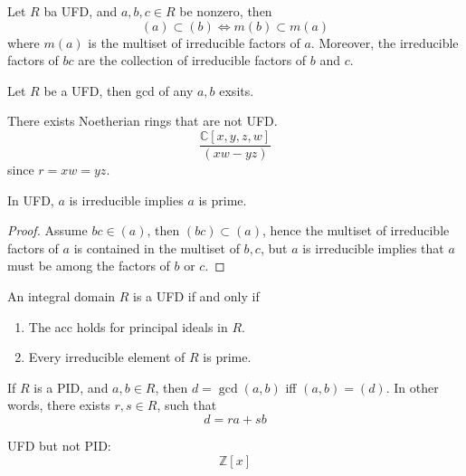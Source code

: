 \documentclass[openany]{book}
\newcommand{\Z}{\mathbb{Z}}
\newcommand{\C}{\mathbb{C}}
\begin{document}
\begin{prop}
    Let $R$ ba UFD, and $a,b,c\in R$ be nonzero, then 
    \begin{equation*}
        (a)\subset(b)\iff m(b)\subset m(a)
    \end{equation*}
    where $m(a)$ is the multiset of irreducible factors of $a$. Moreover, the irreducible factors of $bc$ are the collection of irreducible factors of $b$ and $c$.
\end{prop}



\begin{prop}
    Let $R$ be a UFD, then gcd of any $a,b$ exsits.
\end{prop}
\begin{example}
    There exists Noetherian rings that are not UFD.
    \begin{equation*}
        \frac{\C[x,y,z,w]}{(xw-yz)}
    \end{equation*}
    since $r=xw=yz$.
\end{example}


\begin{prop}
    In UFD, $a$ is irreducible implies $a$ is prime.
\end{prop}
\begin{proof}
    Assume $bc\in (a)$, then $(bc)\subset (a)$, hence the multiset of irreducible factors of $a$ is contained in the multiset of $b,c$, but $a$ is irreducible implies that $a$ must be among the factors of $b$ or $c$.
\end{proof}


\begin{thm}
    An integral domain $R$ is a UFD if and only if 
    \begin{enumerate}
        \item The acc holds for principal ideals in $R$.
        \item Every irreducible element of $R$ is prime.
    \end{enumerate}
\end{thm}

\begin{prop}
    If $R$ is a PID, and $a,b\in R$, then $d=\gcd(a,b)$ iff $(a,b)=(d)$. In other words, there exists $r,s\in R$, such that 
    \begin{equation*}
        d=ra+sb
    \end{equation*}
\end{prop}


\begin{example}
    UFD but not PID:
    \begin{equation*}
        \Z[x]
    \end{equation*}
\end{example}
\end{document}
